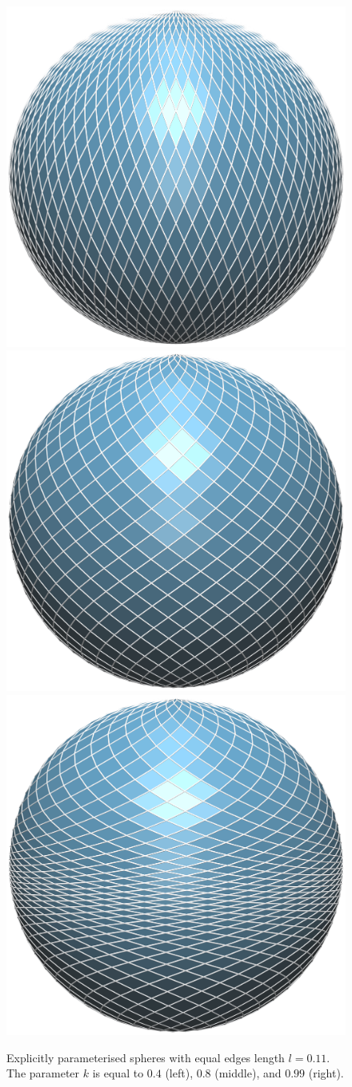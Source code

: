 \begin{figure}[b]
\centering
\includegraphics[width=0.32\linewidth]{images/spheres/k0_4_new.png}
\includegraphics[width=0.32\linewidth]{images/spheres/k0_8_new.png}
\includegraphics[width=0.32\linewidth]{images/spheres/k0_99_new.png}
\caption{Explicitly parameterised spheres with equal edges length $l=0.11$. The parameter $k$ is equal to $0.4$ (left), $0.8$ (middle), and $0.99$ (right).}
\label{fig:spheres}
\end{figure}

